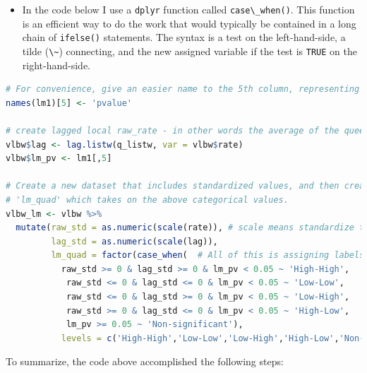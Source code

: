 \documentclass[
]{book}
\newcommand{\passthrough}[1]{#1}
\newenvironment{rmdblock}[1]
  {%
  \begin{itemize}
  \renewcommand{\labelitemi}{
    \raisebox{-.7\height}[0pt][0pt]{
      {\setkeys{Gin}{width=3em,keepaspectratio}\texttt{[image: images/\#1]}}
    }
  }
  \item
  }
  {
  \end{itemize}
  }
\newenvironment{rmdnote}
  {\begin{rmdblock}{note}}
  {\end{rmdblock}}
\begin{document}
\begin{rmdnote}
In the code below I use a \passthrough{\lstinline!dplyr!} function called \passthrough{\lstinline!case\_when()!}. This function is an efficient way to do the work that would typically be contained in a long chain of \passthrough{\lstinline!ifelse()!} statements. The syntax is a test on the left-hand-side, a tilde (\passthrough{\lstinline!\~!}) connecting, and the new assigned variable if the test is \passthrough{\lstinline!TRUE!} on the right-hand-side.
\end{rmdnote}

\begin{lstlisting}[language=R]
# For convenience, give an easier name to the 5th column, representing p-value
names(lm1)[5] <- 'pvalue'

# create lagged local raw_rate - in other words the average of the queen neighbors value
vlbw$lag <- lag.listw(q_listw, var = vlbw$rate)
vlbw$lm_pv <- lm1[,5]

# Create a new dataset that includes standardized values, and then creates a new variable
# 'lm_quad' which takes on the above categorical values.
vlbw_lm <- vlbw %>%
  mutate(raw_std = as.numeric(scale(rate)), # scale means standardize to mean 0, 1 SD
         lag_std = as.numeric(scale(lag)),
         lm_quad = factor(case_when(  # All of this is assigning labels based on values
           raw_std >= 0 & lag_std >= 0 & lm_pv < 0.05 ~ 'High-High',
            raw_std <= 0 & lag_std <= 0 & lm_pv < 0.05 ~ 'Low-Low',
            raw_std <= 0 & lag_std >= 0 & lm_pv < 0.05 ~ 'Low-High',
            raw_std >= 0 & lag_std <= 0 & lm_pv < 0.05 ~ 'High-Low',
            lm_pv >= 0.05 ~ 'Non-significant'),
           levels = c('High-High','Low-Low','Low-High','High-Low','Non-significant')))
\end{lstlisting}

To summarize, the code above accomplished the following steps:
\end{document}

